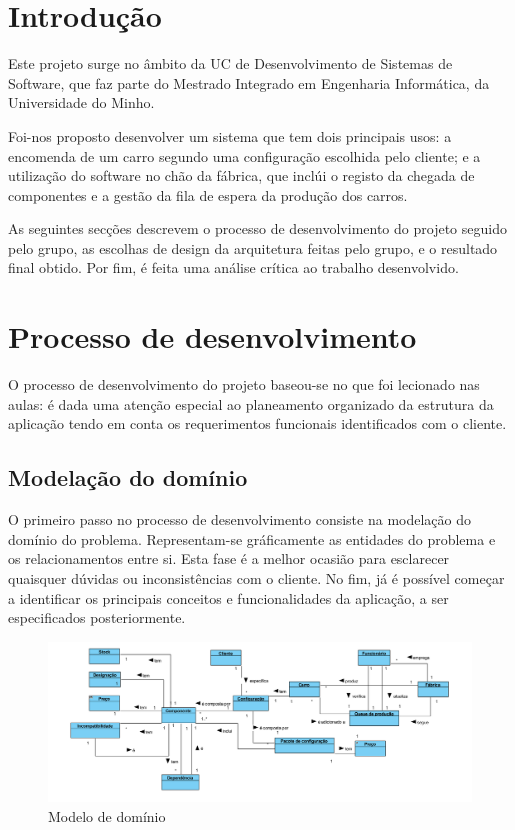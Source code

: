 \documentclass{llncs}
\newcommand\tab[1][0.5cm]{\hspace*{#1}}
\begin{document}
\clearpage

\section{Introdução}

Este projeto surge no âmbito da UC de Desenvolvimento de Sistemas de Software, que faz parte do Mestrado Integrado em Engenharia Informática, da Universidade do Minho.

\tab Foi-nos proposto desenvolver um sistema que tem dois principais usos: a encomenda de um carro segundo uma configuração escolhida pelo cliente; e a utilização do software no chão da fábrica, que inclúi o registo da chegada de componentes e a gestão da fila de espera da produção dos carros. 

\tab As seguintes secções descrevem o processo de desenvolvimento do projeto seguido pelo grupo, as escolhas de design da arquitetura feitas pelo grupo, e o resultado final obtido. Por fim, é feita uma análise crítica ao trabalho desenvolvido.

\clearpage
\section{Processo de desenvolvimento}

\tab O processo de desenvolvimento do projeto baseou-se no que foi lecionado nas aulas: é dada uma atenção especial ao planeamento organizado da estrutura da aplicação tendo em conta os requerimentos funcionais identificados com o cliente.

\subsection{Modelação do domínio}

O primeiro passo no processo de desenvolvimento consiste na modelação do domínio do problema. Representam-se gráficamente as entidades do problema e os relacionamentos entre si. Esta fase é a melhor ocasião para esclarecer quaisquer dúvidas ou inconsistências com o cliente. No fim, já é possível começar a identificar os principais conceitos e funcionalidades da aplicação, a ser especificados posteriormente.

\begin{figure}
\begin{center}
\includegraphics[scale=0.25]{modelo_de_dominio.png} 
\end{center}
\caption{\label{fig:modelo_dominio}Modelo de domínio}
\end{figure} 
\end{document}
